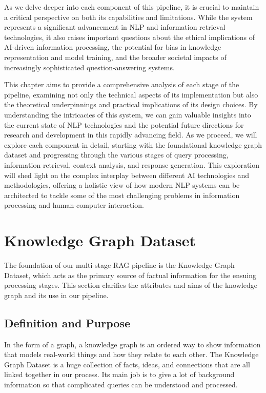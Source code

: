 As we delve deeper into each component of this pipeline, it is crucial to maintain a critical perspective on both its capabilities and limitations.
While the system represents a significant advancement in NLP and information retrieval technologies, it also raises important questions about the ethical implications of AI-driven information processing, the potential for bias in knowledge representation and model training, and the broader societal impacts of increasingly sophisticated question-answering systems.

This chapter aims to provide a comprehensive analysis of each stage of the pipeline, examining not only the technical aspects of its implementation but also the theoretical underpinnings and practical implications of its design choices.
By understanding the intricacies of this system, we can gain valuable insights into the current state of NLP technologies and the potential future directions for research and development in this rapidly advancing field.
As we proceed, we will explore each component in detail, starting with the foundational knowledge graph dataset and progressing through the various stages of query processing, information retrieval, context analysis, and response generation.
This exploration will shed light on the complex interplay between different AI technologies and methodologies, offering a holistic view of how modern NLP systems can be architected to tackle some of the most challenging problems in information processing and human-computer interaction.


\section{Knowledge Graph Dataset}\label{sec:knowledge-graph-dataset}
The foundation of our multi-stage RAG pipeline is the Knowledge Graph Dataset, which acts as the primary source of factual information for the ensuing processing stages.
This section clarifies the attributes and aims of the knowledge graph and its use in our pipeline.

\subsection{Definition and Purpose}\label{subsec:definition-and-purpose}
In the form of a graph, a knowledge graph is an ordered way to show information that models real-world things and how they relate to each other.
The Knowledge Graph Dataset is a huge collection of facts, ideas, and connections that are all linked together in our process.
Its main job is to give a lot of background information so that complicated queries can be understood and processed.

